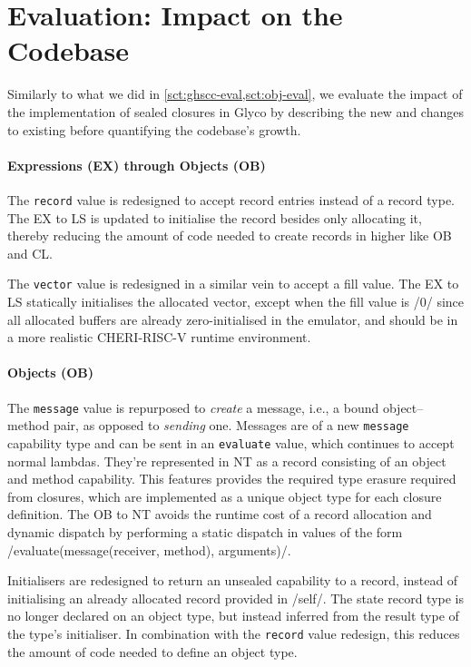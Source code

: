 \documentclass[main.tex]{subfiles}
\begin{document}
\section{Evaluation: Impact on the Codebase} \label{sct:cls-eval}
Similarly to what we did in \cref{sct:ghscc-eval,sct:obj-eval}, we evaluate the impact of the implementation of sealed closures in Glyco by describing the new  and changes to existing  before quantifying the codebase's growth.

\paragraph{Expressions (EX) through Objects (OB)} The \texttt{record} value is redesigned to accept record entries instead of a record type. The EX to LS  is updated to initialise the record besides only allocating it, thereby reducing the amount of code needed to create records in higher  like OB and CL.

The \texttt{vector} value is redesigned in a similar vein to accept a fill value. The EX to LS  statically initialises the allocated vector, except when the fill value is \iil/0/ since all allocated buffers are already zero-initialised in the emulator, and should be in a more realistic CHERI-RISC-V runtime environment.

\paragraph{Objects (OB)} The \texttt{message} value is repurposed to \emph{create} a message, i.e., a bound object–method pair, as opposed to \emph{sending} one. Messages are of a new \texttt{message} capability type and can be sent in an \texttt{evaluate} value, which continues to accept normal lambdas. They're represented in NT as a record consisting of an object and method capability. This features provides the required type erasure required from closures, which are implemented as a unique object type for each closure definition. The OB to NT  avoids the runtime cost of a record allocation and dynamic dispatch by performing a static dispatch in values of the form \iil/evaluate(message(receiver, method), arguments)/.

Initialisers are redesigned to return an unsealed capability to a record, instead of initialising an already allocated record provided in \iil/self/. The state record type is no longer declared on an object type, but instead inferred from the result type of the type's initialiser. In combination with the \texttt{record} value redesign, this reduces the amount of code needed to define an object type.
\end{document}
